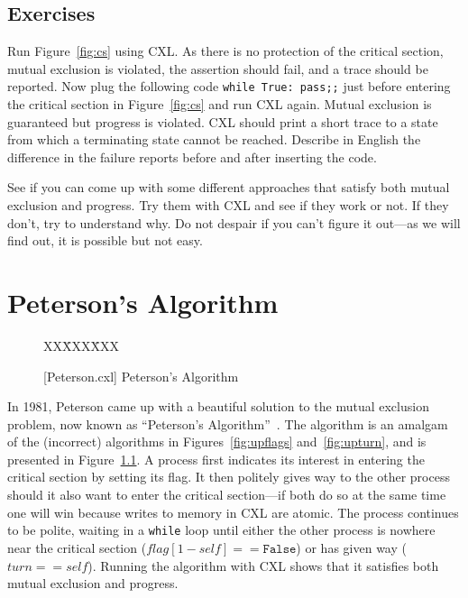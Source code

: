 \documentclass{report}
\newcommand{\cxlsource}[1]{
\begin{tabbing}
XX\=XXX\=XXX\kill
    
\end{tabbing}
}
\newenvironment{code}{
\tcolorbox
}{
\endtcolorbox
}
\begin{document}
\section*{Exercises}
\begin{problems}
\item Run Figure~\ref{fig:cs} using CXL.  As there is no protection of the critical
section, mutual exclusion is violated,
the assertion should fail, and a trace should be reported.
Now plug the following code \texttt{while True: pass;;}
just before entering the critical section
in Figure~\ref{fig:cs} and run CXL again.
Mutual exclusion is guaranteed but progress is violated.
CXL should print a short trace
to a state from which a terminating state cannot be reached.
Describe in English the difference in the failure reports before
and after inserting the code.
\item See if you can come up with some different approaches that satisfy both
mutual exclusion and progress.  Try them with CXL and see if they work or not.
If they don't, try to understand why.
Do not despair if you can't figure it out---as
we will find out, it is possible but not easy.
\end{problems}

\chapter{Peterson's Algorithm}
\label{ch:peterson}

\begin{figure}
\begin{code}
\cxlsource{Peterson}
\end{code}
\caption{[Peterson.cxl] Peterson's Algorithm}
\label{fig:peterson}
\end{figure}

In 1981, Peterson came up with a beautiful solution to the mutual exclusion
problem, now known as ``Peterson's Algorithm''~\cite{Peterson81}.
The algorithm is an amalgam of the (incorrect) algorithms in
Figures~\ref{fig:upflags} and~\ref{fig:upturn}, and is presented
in Figure~\ref{fig:peterson}.
A process first indicates its interest in entering the critical section
by setting its flag.
It then politely gives way to the other process should it also want to
enter the critical section---if both do so at the same time one will
win because writes to memory in CXL are atomic.
The process continues to be polite, waiting in a \texttt{while} loop
until either the other process is nowhere near the critical section
($\mathit{flag}[1 - \mathit{self}] == \mathtt{False}$) or has given way
($\mathit{turn} == \mathit{self}$).
Running the algorithm with CXL shows that it satisfies both mutual
exclusion and progress.
\end{document}
